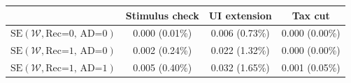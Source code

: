 \begin{tabular}{@{}lccc@{}}
\toprule
                          & Stimulus check      & UI extension    & Tax cut    \\  \midrule
$\mathrm{SE}(\mathcal{W}, \text{Rec=0, AD=0})$ & 0.000 (0.01\%)  & 0.006 (0.73\%)  & 0.000 (0.00\%)     \\
$\mathrm{SE}(\mathcal{W}, \text{Rec=1, AD=0})$ & 0.002 (0.24\%)  & 0.022 (1.32\%)  & 0.000 (0.00\%)     \\
$\mathrm{SE}(\mathcal{W}, \text{Rec=1, AD=1})$ & 0.005 (0.40\%)  & 0.032 (1.65\%)  & 0.001 (0.05\%)     \\ \bottomrule
\end{tabular}
